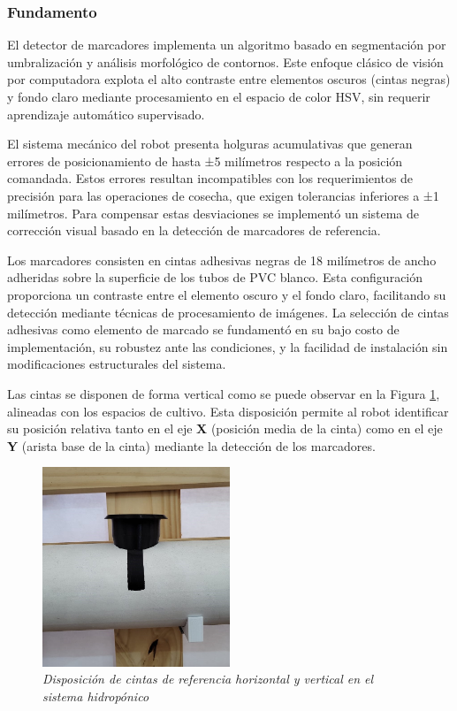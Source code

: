 \subsubsection{Fundamento}

El detector de marcadores implementa un algoritmo basado en segmentación por umbralización y análisis morfológico de contornos. Este enfoque clásico de visión por computadora explota el alto contraste entre elementos oscuros (cintas negras) y fondo claro mediante procesamiento en el espacio de color HSV, sin requerir aprendizaje automático supervisado.

El sistema mecánico del robot presenta holguras acumulativas que generan errores de posicionamiento de hasta ±5 milímetros respecto a la posición comandada. Estos errores resultan incompatibles con los requerimientos de precisión para las operaciones de cosecha, que exigen tolerancias inferiores a ±1 milímetros. Para compensar estas desviaciones se implementó un sistema de corrección visual basado en la detección de marcadores de referencia.

Los marcadores consisten en cintas adhesivas negras de 18 milímetros de ancho adheridas sobre la superficie de los tubos de PVC blanco. Esta configuración proporciona un contraste entre el elemento oscuro y el fondo claro, facilitando su detección mediante técnicas de procesamiento de imágenes. La selección de cintas adhesivas como elemento de marcado se fundamentó en su bajo costo de implementación, su robustez ante las condiciones, y la facilidad de instalación sin modificaciones estructurales del sistema.

Las cintas se disponen de forma vertical como se puede observar en la Figura \ref{fig:configuracion_cintas}, alineadas con los espacios de cultivo. Esta disposición permite al robot identificar su posición relativa tanto en el eje \textbf{X} (posición media de la cinta) como en el eje \textbf{Y} (arista base de la cinta) mediante la detección de los marcadores.

\begin{figure}[H]
\centering
\includegraphics[width=0.50\textwidth]{imagenes/configuracion_cintas_referencia.jpg}
\caption{\textit{Disposición de cintas de referencia horizontal y vertical en el sistema hidropónico}}
\label{fig:configuracion_cintas}
\end{figure}
